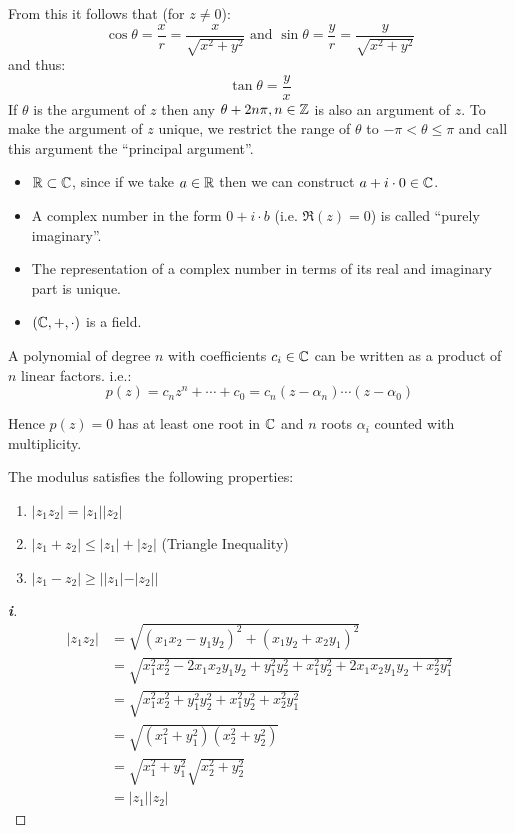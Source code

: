 \documentclass[../main.tex]{subfiles}
\begin{document}
From this it follows that (for $z \neq 0$):
\[
  \cos \theta = \frac{x}{r} = \frac{x}{\sqrt{x^2 + y^2}}\text{ and }\sin \theta = \frac{y}{r} = \frac{y}{\sqrt{x^2 + y^2}}
\]
and thus:
\[
  \tan \theta = \frac{y}{x}
\]
If $\theta$ is the argument of $z$ then any $\theta + 2n\pi, n \in \mathbb{Z}$ is also an argument of $z$.
To make the argument of $z$ unique, we restrict the range of $\theta$ to $-\pi < \theta \leq \pi$ and call this argument the ``principal argument''.
\begin{remark}
  \begin{itemize}
    \item $\mathbb{R} \subset \mathbb{C}$, since if we take $a \in \mathbb{R}$ then we can construct $a + i \cdot 0 \in \mathbb{C}$.
    \item A complex number in the form $0 + i \cdot b$ (i.e. $\Re(z) = 0$) is called ``purely imaginary''.
    \item The representation of a complex number in terms of its real and imaginary part is unique.
    \item $(\mathbb{C}, +, \cdot)$ is a field.
  \end{itemize}
\end{remark}
\begin{theorem}
  A polynomial of degree $n$ with coefficients $c_i \in \mathbb{C}$ can be written as a product of $n$ linear factors. i.e.:
  \[
    p(z) = c_n z^n + \cdots + c_0 = c_n(z - \alpha_n) \cdots (z - \alpha_0)
  \]
\end{theorem}
Hence $p(z) = 0$ has at least one root in $\mathbb{C}$ and $n$ roots $\alpha_i$ counted with multiplicity.
\begin{proposition}
  The modulus satisfies the following properties:
  \begin{enumerate}
    \item $|z_1 z_2| = |z_1||z_2|$
    \item $|z_1 + z_2| \leq |z_1| + |z_2|$ (Triangle Inequality)
    \item $|z_1 - z_2| \geq ||z_1| - |z_2||$
  \end{enumerate}
\end{proposition}
\begin{proof}[\textbf{i}]
  \begin{align*}
      |z_1 z_2| &= \sqrt{(x_1 x_2 - y_1 y_2)^2 + (x_1 y_2 + x_2 y_1)^2}\\
                &= \sqrt{x^{2}_{1} x^{2}_{2} -2x_1x_2y_1y_2 + y^{2}_{1}y^{2}_{2} + x^{2}_{1}y^{2}_{2} + 2x_1x_2y_1y_2 + x^{2}_{2}y^{2}_{1}} \\
                &= \sqrt{x^{2}_{1} x^{2}_{2} + y^{2}_{1} y^{2}_{2} + x^{2}_{1} y^{2}_{2} + x^{2}_{2} y^{2}_{1}} \\
                &= \sqrt{\left(x^{2}_{1} + y^{2}_{1}\right)\left(x^{2}_{2} + y^{2}_{2}\right)} \\
                &= \sqrt{x^{2}_{1} + y^{2}_{1}}\sqrt{x^{2}_{2} + y^{2}_{2}} \\
                &= |z_1||z_2|
  \end{align*}
\end{proof}
\end{document}
